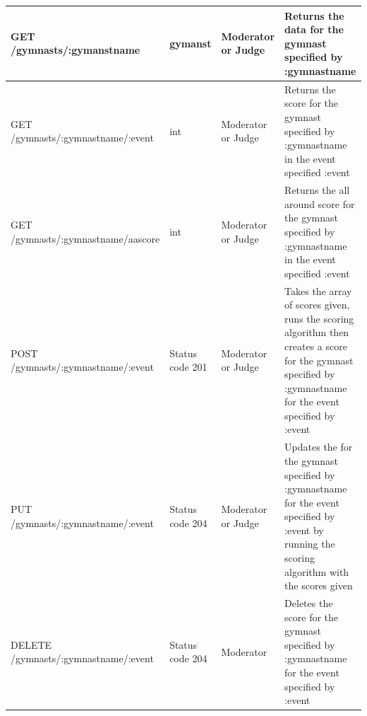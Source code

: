 \documentclass[letterpaper,10pt,draftclsnofoot,onecolumn,]{article}
\begin{document}
\begin{center}
    \begin{tabular}{ | p{15em} | p{8em} | p{7em} | p{20em} | }
    \hline
    GET /gymnasts/:gymanstname & gymanst & Moderator or Judge & Returns the data for the gymnast specified by :gymnastname \\
    \hline
    GET /gymnasts/:gymnastname/:event & int & Moderator or Judge & Returns the score for the gymnast specified by :gymnastname in the event specified :event \\
    \hline
    GET /gymnasts/:gymnastname/aascore & int & Moderator or Judge & Returns the all around score for the gymnast specified by :gymnastname in the event specified :event\\
    \hline
    POST /gymnasts/:gymnastname/:event & Status code 201 & Moderator or Judge & Takes the array of scores given, runs the scoring algorithm then creates a score for the gymnast specified by :gymnastname for the event specified by :event \\
    \hline
    PUT /gymnasts/:gymnastname/:event & Status code 204 & Moderator or Judge & Updates the for the gymnast specified by :gymnastname for the event specified by :event by running the scoring algorithm with the scores given \\
    \hline
    DELETE /gymnasts/:gymnastname/:event & Status code 204 & Moderator & Deletes the score for the gymnast specified by :gymnastname for the event specified by :event \\
    \hline
    \end{tabular}
\end{center}
\end{document}
